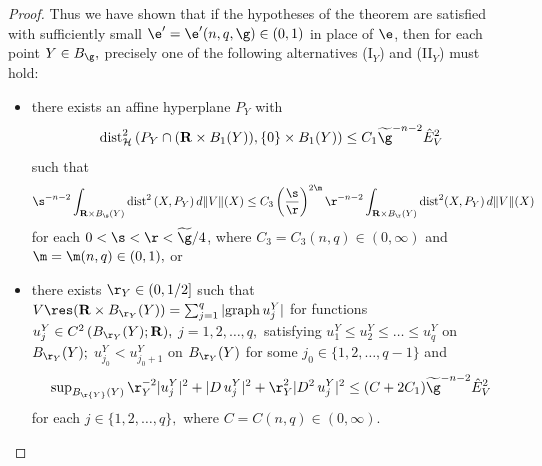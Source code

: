\documentclass[a4paper,11pt]{amsart}
\begin{document}
\begin{proof}
Thus we have shown that if the hypotheses of the theorem are satisfied with sufficiently small $\e^{\prime} = \e^{\prime}(n, q, \g) \in (0, 1)$ in place of $\e$, then for each point $Y \in B_{\g},$ precisely one of the following alternatives 
(I$_{Y}$) and (II$_{Y}$) must hold:
\begin{itemize}
\item[(I$_{Y}$)] there exists an affine hyperplane $P_{Y}$ with
\begin{equation}\label{sheeting-11}
{\rm dist}_{\mathcal H}^{2} \, (P_{Y} \cap ({\mathbf R} \times B_{1}(Y)), \{0\} \times B_{1}(Y)) \leq C_{1}\widetilde{\g}^{-n-2}{\hat E}_{V}^{2}
\end{equation}
such that
\begin{equation}\label{sheeting-12}
\s^{-n-2}\int_{{\mathbf R} \times B_{\s}(Y)} {\rm dist}^{2} \, (X, P_{Y}) \, d\|V\|(X) \leq C_{3}\left(\frac{\s}{\r}\right)^{2\m}\r^{-n-2}\int_{{\mathbf R} \times B_{\r}(Y)} {\rm dist}^{2}(X, P_{Y}) \, d\|V\|(X) 
\end{equation}
for each $0 < \s < \r < \widetilde{\g}/4$, where $C_{3} = C_{3}(n, q) \in (0, \infty)$ and $\m= \m(n, q) \in (0, 1),$ or 
\item[(II$_{Y}$)] there exists 
$\r_{Y} \in (0, 1/2]$ such that $V \res ({\mathbf R} \times B_{\r_{Y}}(Y)) = 
\sum_{j=1}^{q} |{\rm graph} \, u_{j}^{Y}|$ for 
functions $u_{j}^{Y} \in C^{2} \, (B_{\r_{Y}}(Y); {\mathbf R}),$ $j= 1, 2, \ldots, q,$
satisfying $u_{1}^{Y} \leq u_{2}^{Y} \leq \ldots \leq u_{q}^{Y}$ on $B_{\r_{Y}}(Y);$ 
$u_{j_{0}}^{Y} < u_{j_{0}+1}^{Y}$ on $B_{\r_{Y}}(Y)$ for some $j_{0} \in \{1, 2, \ldots, q-1\}$ and 
\begin{equation}\label{sheeting-13}
{\rm sup}_{B_{\r{Y}}(Y)} \, \r_{Y}^{-2}|u_{j}^{Y}|^{2} + |D \, u_{j}^{Y}|^{2} + \r_{Y}^{2}|D^{2} \, u_{j}^{Y}|^{2} \leq 
(C+ 2C_{1}) \widetilde{\g}^{-n-2}{\hat E}_{V}^{2}
\end{equation}
for each $j \in \{1, 2, \ldots, q\},$ where $C = C(n, q) \in (0, \infty).$
\end{itemize}


\end{proof}
\end{document}
